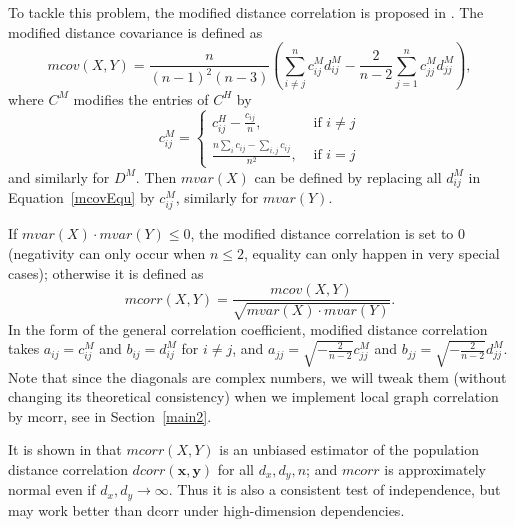 \documentclass[11pt]{article}
\providecommand{\mb}[1]{\boldsymbol{#1}}
\begin{document}
To tackle this problem, the modified distance correlation is proposed in \cite{SzekelyRizzo2013a}. The modified distance covariance is defined as
\begin{equation}
\label{mcovEqu}
mcov(X,Y)=\frac{n}{(n-1)^2(n-3)}(\sum_{i \neq j}^{n}c^{M}_{ij}d^{M}_{ij}-\frac{2}{n-2}\sum_{j=1}^{n}c^{M}_{jj}d^{M}_{jj}),
\end{equation}
where $C^{M}$ modifies the entries of $C^{H}$ by
\[c^{M}_{ij} = \left\{
  \begin{array}{lr}
    c^{H}_{ij}-\frac{c_{ij}}{n}, & \mbox{ if } i \neq j \\
    \frac{n\sum_{i}c_{ij}-\sum_{i,j}c_{ij}}{n^2}, &\mbox{ if } i = j 
  \end{array}
\right.
\]
and similarly for $D^{M}$. Then $mvar(X)$ can be defined by replacing all $d^{M}_{ij}$ in Equation~\eqref{mcovEqu} by $c^{M}_{ij}$, similarly for $mvar(Y)$. 

If $mvar(X) \cdot mvar(Y) \leq 0$, the modified distance correlation is set to $0$ (negativity can only occur when $n\leq 2$, equality can only happen in very special cases); otherwise it is defined as
\begin{equation}
\label{mcorrEqu}
mcorr(X,Y)=\frac{mcov(X,Y)}{\sqrt{mvar(X) \cdot mvar(Y)}}.
\end{equation}
In the form of the general correlation coefficient, modified distance correlation takes $a_{ij}=c^{M}_{ij}$ and $b_{ij}=d^{M}_{ij}$ for $i \neq j$, and $a_{jj}=\sqrt{-\frac{2}{n-2}}c^{M}_{jj}$ and $b_{jj}=\sqrt{-\frac{2}{n-2}}d^{M}_{jj}$. Note that since the diagonals are complex numbers, we will tweak them (without changing its theoretical consistency) when we implement local graph correlation by mcorr, see in Section~\ref{main2}.

It is shown in \cite{SzekelyRizzo2013a} that $mcorr(X,Y)$ is an unbiased estimator of the population distance correlation $dcorr(\mb{x},\mb{y})$ for all $d_{x}, d_{y}, n$; and $mcorr$ is approximately normal even if $d_{x},d_{y} \rightarrow \infty$. Thus it is also a consistent test of independence, but may work better than dcorr under high-dimension dependencies. 
\end{document}

